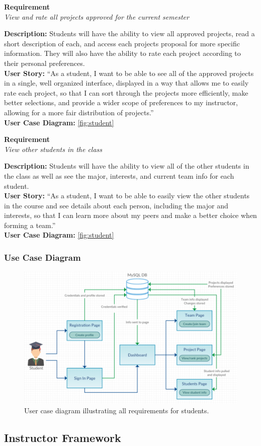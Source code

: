 \documentclass[12pt]{article}
\newcommand{\requirement}[4] {
		\noindent
		\begin{center}\textbf{Requirement\\}\textit{#1}\\\end{center}
		\textbf{Description:} #2\\
		\textbf{User Story:} ``#3''\\
		\textbf{User Case Diagram:} #4\\
}
\begin{document}
\requirement{View and rate all projects approved for the current semester}
			{Students will have the ability to view all approved projects, read a short description of each, and access each projects proposal for more specific information. They will also have the ability to rate each project according to their personal preferences.}
			{As a student, I want to be able to see all of the approved projects in a single, well organized interface, displayed in a way that allows me to easily rate each project, so that I can sort through the projects more efficiently, make better selections, and provide a wider scope of preferences to my instructor, allowing for a more fair distribution of projects.}
			{\autoref{fig:student}}

\requirement{View other students in the class}
			{Students will have the ability to view all of the other students in the class as well as see the major, interests, and current team info for each student.}
			{As a student, I want to be able to easily view the other students in the course and see details about each person, including the major and interests, so that I can learn more about my peers and make a better choice when forming a team.}
			{\autoref{fig:student}}

\subsubsection{Use Case Diagram}
\begin{figure}[!htb]
	\includegraphics[width=\linewidth]{student.png}
	\caption{User case diagram illustrating all requirements for students.}
	\label{fig:student}
\end{figure}

\subsection{Instructor Framework}
\end{document}

